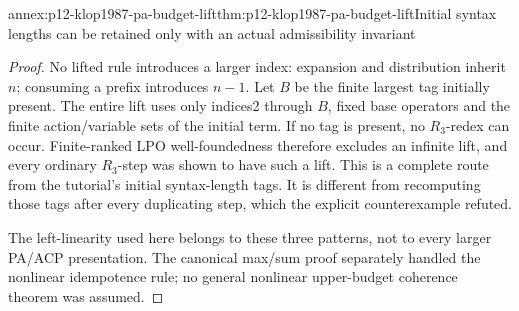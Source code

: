 \begin{annexitem}{annex:p12-klop1987-pa-budget-lift}{thm:p12-klop1987-pa-budget-lift}{Initial syntax lengths can be retained only with an actual admissibility invariant}
\begin{proof}
No lifted rule introduces a larger index: expansion and distribution
inherit \(n\); consuming a prefix introduces \(n-1\).
Let \(B\) be the finite largest tag initially present. The entire
lift uses only indices2 through \(B\), fixed base operators and
the finite action/variable sets of the initial term. If no tag is
present, no \(R_3\)-redex can occur. Finite-ranked LPO
well-foundedness therefore excludes an infinite lift, and every
ordinary \(R_3\)-step was shown to have such a lift. This is
a complete route from the tutorial's initial syntax-length tags.
It is different from recomputing those tags after every duplicating
step, which the explicit counterexample refuted.

The left-linearity used here belongs to these three patterns,
not to every larger PA/ACP presentation. The canonical max/sum
proof separately handled the nonlinear idempotence rule; no
general nonlinear upper-budget coherence theorem was assumed.
\end{proof}
\end{annexitem}

